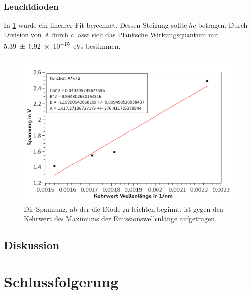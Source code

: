 \documentclass[
	a4paper,
	12pt,
	pagesize,
	ngerman
]{scrartcl}
\begin{document}
	\subsubsection{Leuchtdioden}
	In \cref{fig_led} wurde ein linearer Fit berechnet. 
	Dessen Steigung sollte $hc$ betragen.
	Durch Division von $A$ durch $c$ lässt sich das Planksche Wirkungsquantum mit \SI{5,39 +- 0,92 e-15}{eVs} bestimmen.


	\begin{figure}[H] 
		\includegraphics[width=1\textwidth]{fig_led} 
		\centering
		\caption{Die Spannung, ab der die Diode zu leichten beginnt, ist gegen den Kehrwert des Maximums der Emissionswellenlänge aufgetragen.}
		\label{fig_led}
		\centering
	\end{figure}	
	
	\subsection{Diskussion}
	
	\section{Schlussfolgerung}
	
\end{document}
